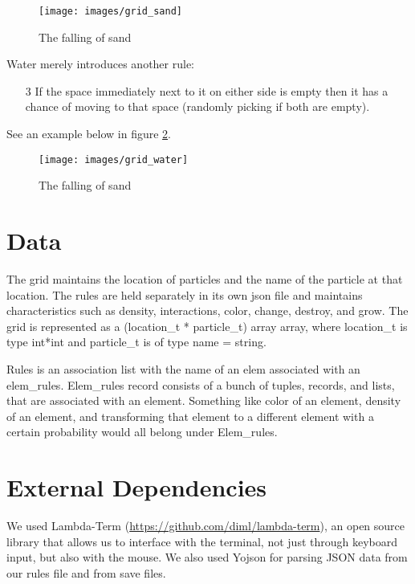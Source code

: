 \begin{figure}[H]
  \caption{The falling of sand}
  \label{fig:sand}
  \vspace{3em}
  \center\texttt{[image: images/grid\_sand]}
\end{figure}

Water merely introduces another rule:
\begin{enumerate}
  \item[3] If the space immediately next to it on either side is empty then it has a chance
    of moving to that space (randomly picking if both are empty).
\end{enumerate}
See an example below in figure \ref{fig:water}.

\begin{figure}[H]
  \caption{The falling of sand}
  \label{fig:water}
  \vspace{3em}
  \center\texttt{[image: images/grid\_water]}
\end{figure}

\section{Data}
The grid maintains the location of particles and the name of the particle at that location. The rules are held separately in its own json file and maintains characteristics such as density, interactions, color, change, destroy, and grow. The grid is represented as a (location\_t * particle\_t) array array, where location\_t is type int*int and particle\_t is of type {name = string}. 

Rules is an association list with the name of an elem associated with an elem\_rules. Elem\_rules record consists of 
a bunch of tuples, records, and lists, that are associated with an element. Something like color of an element, 
density of an element, and transforming that element to a different element with a certain probability would
all belong under Elem\_rules.

\section{External Dependencies}
We used Lambda-Term (\url{https://github.com/diml/lambda-term}), an open source library that allows us to interface with the terminal, not just through keyboard input, but also with the mouse. We also used Yojson for parsing JSON data from our rules file and from save files.

